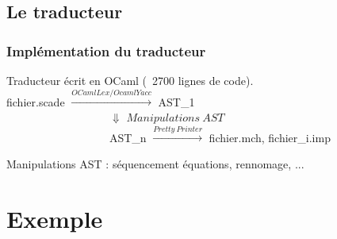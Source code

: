 \documentclass[10pt]{beamer}
\begin{document}
\subsection{Le traducteur}
\frame{\subsectionpage}

\begin{frame}
\frametitle{Implémentation du traducteur}

Traducteur écrit en OCaml (~2700 lignes de code).\\
\vspace{0.5cm}
fichier.scade $\xrightarrow{OCamlLex/OcamlYacc}$ AST\_1 \\
\vspace{0.6cm}
$~~~~~~~~~~~~~~~~~~~~~~~~~~~~~~~~~~~~~~~~~~\Downarrow$ $Manipulations ~AST$\\
\vspace{0.6cm}
$~~~~~~~~~~~~~~~~~~~~~$$~~~~~~~~~~~~~~~~~~~~~$AST\_n $\xrightarrow{Pretty~Printer}$ fichier.mch, fichier\_i.imp
\vspace{0.5cm}

Manipulations AST : séquencement équations, rennomage, ...

\end{frame}


\section{Exemple}
\frame{\sectionpage}
\end{document}
